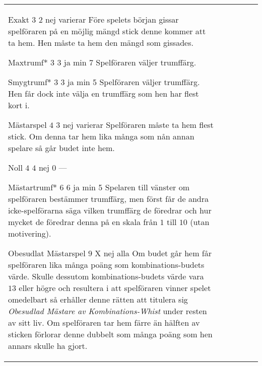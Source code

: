 \begin{table}
\begin{center}
\begin{tabularx}{\textwidth}{lcccc|X}
				\standardBidItem%
				{Exakt}
				{$3$}
				{$2$}
				{nej}
				{varierar}
				{%
					Före spelets början gissar spelföraren på en möjlig mängd stick denne kommer att ta hem. Hen måste ta hem den mängd som gissades.
				}

				\standardBidItem%
				{Maxtrumf*}
				{$3$}
				{$3$}
				{ja}
				{min 7}
				{%
					Spelföraren väljer trumffärg.
				}

				\standardBidItem%
				{Smygtrumf*}
				{$3$}
				{$3$}
				{ja}
				{min 5}
				{%
					Spelföraren väljer trumffärg. Hen får dock inte välja en trumffärg som hen har flest kort i.
				}

				\standardBidItem%
				{Mästarspel}
				{$4$}
				{$3$}
				{nej}
				{varierar}
				{%
					Spelföraren måste ta hem flest stick. Om denna tar hem lika många som nån annan spelare så går budet inte hem.
				}

				\standardBidItem%
				{Noll}
				{$4$}
				{$4$}
				{nej}
				{0}
				{%
					---
				}

				\standardBidItem%
				{Mästartrumf*}
				{$6$}
				{$6$}
				{ja}
				{min 5}
				{%
					Spelaren till vänster om spelföraren bestämmer trumffärg, men först får de andra icke-spelförarna säga vilken trumffärg de föredrar och hur mycket de föredrar denna på en skala från $1$ till $10$ (utan motivering).
				}

				\standardBidItem%
				{Obesudlat Mästarspel}
				{$9$}
				{X}
				{nej}
				{alla}
				{%
					Om budet går hem får spelföraren lika många poäng som kombinations-budets värde. Skulle dessutom kombinations-budets värde vara $13$ eller högre och resultera i att spelföraren vinner spelet omedelbart så erhåller denne rätten att titulera sig \emph{Obesudlad Mästare av Kombinations-Whist} under resten av sitt liv. Om spelföraren tar hem färre än hälften av sticken förlorar denne dubbelt som många poäng som hen annars skulle ha gjort.
				}
		\end{tabularx}
	\end{center}
\end{table}
